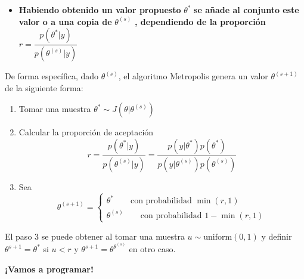 \documentclass[11pt]{beamer}
\begin{document}
\begin{frame}
	\begin{itemize}
		\item \textbf{Habiendo obtenido un valor propuesto} $\theta^{*}$ \textbf{se añade al conjunto este valor o a una copia de } $\theta^{(s)}$ \textbf{, dependiendo de la proporción } $ r = \dfrac{p(\theta^{*} | y)}{p(\theta^{(s)}|y)}$
	\end{itemize}
\end{frame}


\begin{frame}
De forma específica, dado $\theta^{(s)}$, el algoritmo Metropolis genera un valor $\theta^{(s+1)}$ de la siguiente forma:

	\begin{enumerate}
		\item Tomar una muestra $\theta^{*} \sim J(\theta | \theta^{(s)})$
		\item Calcular la proporción de aceptación
			\begin{equation*}
					r = \dfrac{p(\theta^{*} | y)}{p(\theta^{(s)} | y)} = \dfrac{p(y | \theta^{*}) p(\theta^{*})}{p(y | \theta^{(s)})p(\theta^{(s)})}
			\end{equation*}
		\item Sea
		\begin{equation}
		  \theta^{(s+1)} =
    		\begin{cases}
      			\theta^{*} \qquad \text{con probabilidad $\min(r,1)$}\\
  	  			\theta^{(s)} \qquad \text{con probabilidad $1- \min(r,1)$}
    		\end{cases}       
		\end{equation}

	\end{enumerate}
	
	El paso 3 se puede obtener al tomar una muestra $u \sim \text{uniform}(0,1)$ y definir $\theta^{s+1}= \theta^{*}$ si $u < r$ y $\theta^{s+1}= \theta^{\theta^{(s)}}$ en otro caso. 
\end{frame}



\begin{frame}
	\begin{center}
		{\huge \textbf{¡Vamos a programar!}}
	\end{center}
\end{frame}
\end{document}
